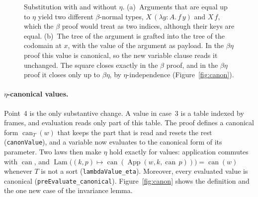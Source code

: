 \documentclass[10pt]{article}
\newcommand{\canon}{\operatorname{can}}
\newcommand{\App}{\operatorname{App}}
\newcommand{\Lam}{\operatorname{Lam}}
\begin{document}
\begin{figure}[H]
\caption{Substitution with and without $\eta$. (a)~Arguments that are equal up to
$\eta$ yield two different $\beta$-normal types, $X\,(\lambda y{:}A.\,f\,y)$ and $X\,f$,
which the $\beta$ proof would treat as two indices, although their keys are equal.
(b)~The tree of the argument is grafted into the tree of the codomain at $x$, with
the value of the argument as payload. In the $\beta\eta$ proof this value is
canonical, so the new variable clause reads it unchanged. The square closes exactly
in the $\beta$ proof, and in the $\beta\eta$ proof it closes only up to $\beta\eta$,
by $\eta$-independence (Figure~\ref{fig:canon}).}
\label{fig:subst}
\end{figure}

\paragraph{$\eta$-canonical values.} Point~4 is the only substantive change. A value
in case~3 is a table indexed by frames, and evaluation reads only part of this table.
The proof defines a canonical form $\canon_T(w)$ that keeps the part that is read
and resets the rest (\texttt{canonValue}), and a variable now evaluates to the
canonical form of its parameter. Two laws then make $\eta$ hold exactly for values:
application commutes with $\canon$, and
$\Lam\bigl((k,p)\mapsto\canon(\App(w,k,\canon\,p))\bigr)=\canon(w)$ whenever $T$ is
not a sort (\texttt{lambdaValue\_eta}). Moreover, every evaluated value is canonical
(\texttt{preEvaluate\_canonical}). Figure~\ref{fig:canon} shows the definition and
the one new case of the invariance lemma.
\end{document}
